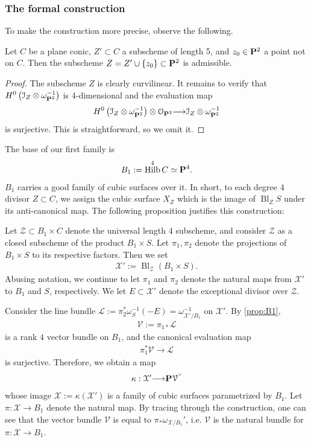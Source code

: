 \documentclass[12pt,reqno]{amsart}
\DeclareMathOperator{\Bl}{Bl}
\DeclareMathOperator{\Hilb}{Hilb}
\renewcommand{\to}{{\longrightarrow}}
\numberwithin{equation}{section}
\renewcommand{\O}{\mathcal O}
\newcommand{\V}{\mathcal V}
\newcommand{\cX}{\mathcal{X}}
\newcommand{\smvee}{\raise0.5ex\hbox{$\scriptscriptstyle\vee$}}
\begin{document}
\subsubsection{The formal construction}\label{sec:construction-b_1}
To make the construction more precise, observe the following.
\begin{proposition}
  \label{prop:B1}
  Let $C$ be a plane conic, $Z' \subset C$ a subscheme of length 5, and $z_0 \in \P^2$ a point not on $C$.
  Then the subscheme $Z = Z' \cup \{z_0\} \subset \P^2$ is admissible.
\end{proposition}
\begin{proof}
  The subscheme $Z$ is clearly curvilinear.
  It remains to verify that $H^0\left(\mathcal I_Z \otimes \omega_{\P^2}^{-1}\right)$ is 4-dimensional and the evaluation map
  \[ H^0\left(\mathcal I_Z \otimes \omega_{\P^2}^{-1}\right) \otimes \O_{\P^2} \to \mathcal I_Z \otimes \omega_{\P^2}^{-1}\]
  is surjective.
  This is straightforward, so we omit it.
\end{proof}




The base of our first family is
\begin{align}
  \label{eq:B1}
  B_1 := \Hilb^{4}C \simeq \P^{4}.
\end{align}
$B_1$ carries a good family of cubic surfaces over it.  In short, to
each degree $4$ divisor $Z \subset C$, we assign the cubic surface
$X_{Z}$ which is the image of $\Bl_{Z}S$ under its anti-canonical
map. The following proposition justifies this construction:


Let $\mathcal{Z} \subset B_1 \times C$ denote the universal
length $4$ subscheme, and consider $\mathcal{Z}$ as a closed subscheme
of the product $B_1 \times S$. Let $\pi_{1}, \pi_{2}$ denote the
projections of $B_1 \times S$ to its respective factors.
Then we set
\begin{align}
  \label{eq:X1}
  \cX' := \Bl_{\mathcal{Z}} \left( B_1 \times S \right).
\end{align}
Abusing notation, we continue to let $\pi_{1}$ and $\pi_{2}$ denote
the natural maps from $\cX'$ to $B_1$ and $S$, respectively.  We
let $E \subset \cX'$ denote the exceptional divisor over $\mathcal{Z}$.


Consider the line bundle
$\mathcal{L} := \pi_{2}^{*}\omega_{S}^{-1} (-E) =
\omega_{\cX'/B_{1}}^{-1}$ on $\cX'$.  By \autoref{prop:B1},
\begin{align}
  \label{eq:V1}
  \V := \pi_{1 *}\mathcal{L}
\end{align}
is a rank $4$ vector bundle on $B_1$, and the canonical evaluation map
\begin{align}
  \label{eq:eval1}
  \pi_{1}^{*}\V \to \mathcal{L}
\end{align}
is surjective.  Therefore, we obtain a map
\begin{align}
  \label{eq:X11}
  \kappa: \cX' \to \P \V^{\smvee}
\end{align}
whose image $\cX := \kappa(\cX')$ is a family of cubic surfaces
parametrized by $B_1$.  Let $\pi: \cX \to B_1$ denote the natural map.
By tracing through the construction, one can see that the vector
bundle $\V$ is equal to $\pi_{*} \omega_{\cX/B_1}'$, i.e. $\V$ is the
natural bundle for $\pi: \cX \to B_1$.
\end{document}
